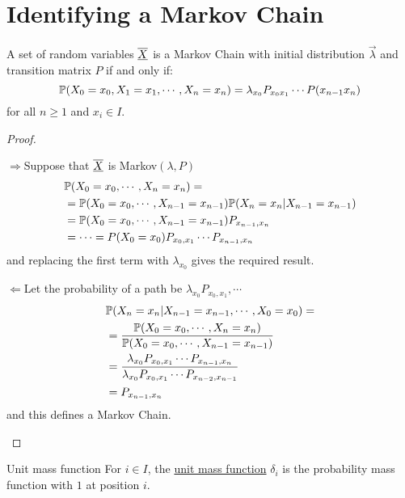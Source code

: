 \documentclass[../Main.tex]{subfiles}
\begin{document}
\section{Identifying a Markov Chain}
\begin{theorem}
    A set of random variables $\chain{X}$ is a Markov Chain with initial distribution $\vec{\lambda}$ and transition matrix $P$ if and only if:
    \begin{equation*}
        \P(X_0 = x_0, X_1 = x_1, \cdots, X_n = x_n) = \lambda_{x_0} P_{x_0 x_1} \cdots P(x_{n-1} x_n)
    \end{equation*}
    for all $n \geq 1$ and $x_i \in I$.
    \label{thmMarkovPathEquivalence}
\end{theorem}
\begin{proof}
    \begin{proofdirection}{$\Rightarrow$}{Suppose that $\chain{X}$ is Markov$(\lambda, P)$}
        \begin{align*}
            &\P(X_0 = x_0, \cdots, X_n = x_n) = \\
            &= \P(X_0 = x_0, \cdots, X_{n-1} = x_{n-1}) \P(X_n = x_n | X_{n-1} = x_{n-1}) \\
            &= \P(X_0 = x_0, \cdots, X_{n-1} = x_{n-1}) P_{x_{n-1}, x_n} \\
            &= \cdots = P(X_0 = x_0) P_{x_0, x_1} \cdots P_{x_{n-1}, x_n} \\
        \end{align*}
        and replacing the first term with $\lambda_{x_0}$ gives the required result.
    \end{proofdirection}
    \begin{proofdirection}{$\Leftarrow$}{Let the probability of a path be $\lambda_{x_0} P_{{x_0}, {x_1}}, \cdots$}
        \begin{align*}
            &\P(X_n = x_n | X_{n - 1} = x_{n-1}, \cdots, X_0 = x_0) = \\
            &= \frac{\P(X_0 = x_0, \cdots, X_n = x_n)}{\P(X_0 = x_0, \cdots, X_{n-1} = x_{n-1})} \\
            &= \frac{\lambda_{x_0} P_{x_0, x_1} \cdots P_{x_{n-1}, x_n}}{\lambda_{x_0} P_{x_0, x_1} \cdots P_{x_{n-2}, x_{n-1}}} \\
            &= P_{x_{n-1}, x_n}
        \end{align*}        
        and this defines a Markov Chain.
    \end{proofdirection}
\end{proof}
\begin{definition}{Unit mass function}
    For $i \in I$, the \underline{unit mass function} $\delta_i$ is the probability mass function with $1$ at position $i$.
\end{definition}
\end{document}

